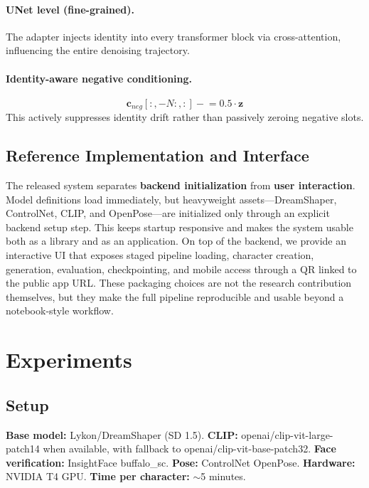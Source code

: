 \documentclass[10pt,twocolumn]{article}
\begin{document}
\paragraph{UNet level (fine-grained).}
The adapter injects identity into every transformer block via cross-attention, influencing the entire denoising trajectory.

\paragraph{Identity-aware negative conditioning.}
\begin{equation}
\mathbf{c}_{neg}[:, -N:, :] \mathrel{-}= 0.5 \cdot \mathbf{z}
\end{equation}
This actively suppresses identity drift rather than passively zeroing negative slots.

\subsection{Reference Implementation and Interface}

The released system separates \textbf{backend initialization} from \textbf{user interaction}. Model definitions load immediately, but heavyweight assets---DreamShaper, ControlNet, CLIP, and OpenPose---are initialized only through an explicit backend setup step. This keeps startup responsive and makes the system usable both as a library and as an application. On top of the backend, we provide an interactive UI that exposes staged pipeline loading, character creation, generation, evaluation, checkpointing, and mobile access through a QR linked to the public app URL. These packaging choices are not the research contribution themselves, but they make the full pipeline reproducible and usable beyond a notebook-style workflow.

\section{Experiments}

\subsection{Setup}

\textbf{Base model:} Lykon/DreamShaper (SD 1.5).
\textbf{CLIP:} openai/clip-vit-large-patch14 when available, with fallback to openai/clip-vit-base-patch32.
\textbf{Face verification:} InsightFace buffalo\_sc.
\textbf{Pose:} ControlNet OpenPose.
\textbf{Hardware:} NVIDIA T4 GPU.
\textbf{Time per character:} $\sim$5 minutes.
\end{document}
